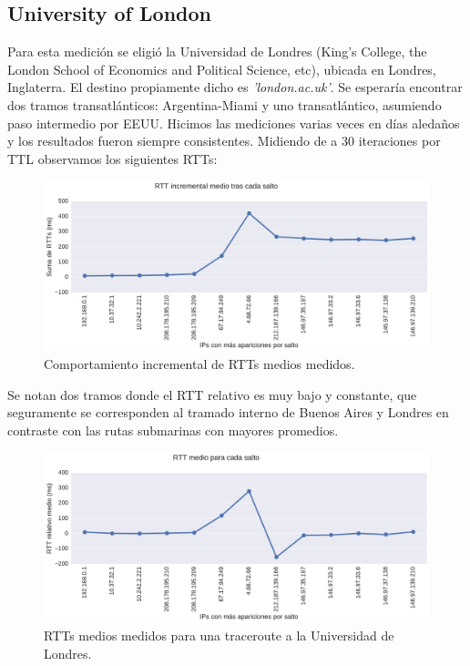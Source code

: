 \subsection{University of London}
Para esta medición se eligió la Universidad de Londres (King's College, the London School of Economics and Political Science, etc), ubicada en Londres, Inglaterra. El destino propiamente dicho es \emph{'london.ac.uk'}. Se esperaría encontrar dos tramos transatlánticos: Argentina-Miami y uno transatlántico, asumiendo paso intermedio por EEUU. Hicimos las mediciones varias veces en días aledaños y los resultados fueron siempre consistentes.  Midiendo de a 30 iteraciones por TTL observamos los siguientes RTTs:
\\

\begin{figure}[H]
    \centering
    \includegraphics[width=1\textwidth, height=1\textheight, keepaspectratio]{../img/lan-incrementales}
    \caption{Comportamiento incremental de RTTs medios medidos.}
    \label{fig:lan-incrementales}
\end{figure}

Se notan dos tramos donde el RTT relativo es muy bajo y constante, que seguramente se corresponden al tramado interno de Buenos Aires y Londres en contraste con las rutas submarinas con mayores promedios.

\begin{figure}[H]
   \centering
       \includegraphics[width=1\textwidth, height=1\textheight, keepaspectratio]{../img/lan-rtts}
 \caption{RTTs medios medidos para una traceroute a la Universidad de Londres.}
 \label{fig:lan-rtts}
\end{figure}


